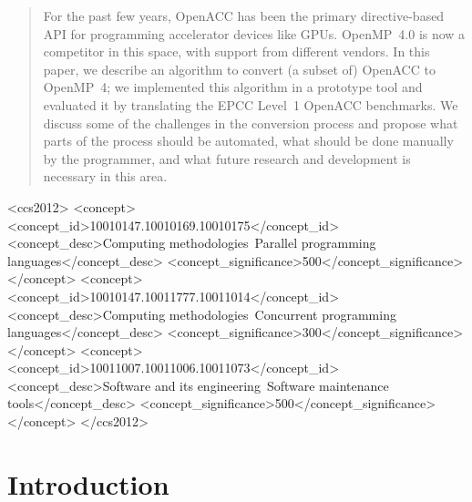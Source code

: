 \documentclass{sig-alternate-05-2015}
\begin{document}
\maketitle
\begin{abstract}
For the past few years, OpenACC has been the primary directive-based API for
programming accelerator devices like GPUs.  OpenMP~4.0 is now a competitor in
this space, with support from different vendors.  In this paper, we describe an
algorithm to convert (a subset of) OpenACC to OpenMP~4; we implemented this
algorithm in a prototype tool and evaluated it by translating the EPCC Level~1
OpenACC benchmarks.  We discuss some of the challenges in the conversion
process and propose what parts of the process should be automated, what should
be done manually by the programmer, and what future research and development is
necessary in this area.
\end{abstract}

%
%
\begin{CCSXML}
<ccs2012>
<concept>
<concept_id>10010147.10010169.10010175</concept_id>
<concept_desc>Computing methodologies~Parallel programming languages</concept_desc>
<concept_significance>500</concept_significance>
</concept>
<concept>
<concept_id>10010147.10011777.10011014</concept_id>
<concept_desc>Computing methodologies~Concurrent programming languages</concept_desc>
<concept_significance>300</concept_significance>
</concept>
<concept>
<concept_id>10011007.10011006.10011073</concept_id>
<concept_desc>Software and its engineering~Software maintenance tools</concept_desc>
<concept_significance>500</concept_significance>
</concept>
</ccs2012>
\end{CCSXML}


%
%

%
%
\printccsdesc



\section{Introduction}
\end{document}
